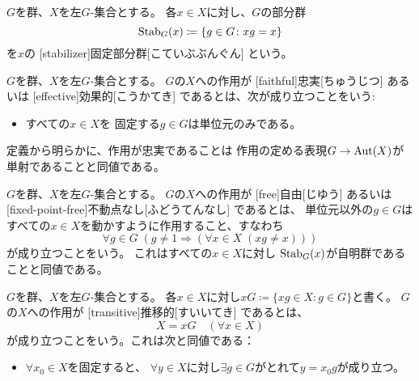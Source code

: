 \documentclass[report]{jlreq}
\begin{document}
\begin{definition}[固定部分群]
    $G$を群、$X$を左$G$-集合とする。
    各$x \in X$に対し、$G$の部分群
    \begin{equation}
        \operatorname{Stab}_G(x) \coloneqq \{ g \in G \colon xg = x \}
    \end{equation}
    を$x$の
    [stabilizer]{固定部分群}[こていぶぶんぐん]
    という。
\end{definition}

\begin{definition}[忠実作用]
    $G$を群、$X$を左$G$-集合とする。
    $G$の$X$への作用が
    [faithful]{忠実}[ちゅうじつ]
    あるいは
    [effective]{効果的}[こうかてき]
    であるとは、次が成り立つことをいう:
    \begin{itemize}
        \item すべての$x \in X$を
            固定する$g \in G$は単位元のみである。
    \end{itemize}
    定義から明らかに、作用が忠実であることは
    作用の定める表現$G \to \operatorname{Aut}(X)$が単射であることと同値である。
\end{definition}

\begin{definition}[自由作用]
    $G$を群、$X$を左$G$-集合とする。
    $G$の$X$への作用が
    [free]{自由}[じゆう]
    あるいは
    [fixed-point-free]{不動点なし}[ふどうてんなし]
    であるとは、
    単位元以外の$g \in G$はすべての$x \in X$を動かすように作用すること、すなわち
    \begin{equation}
        \forall g \in G \; (g \neq 1 \Rightarrow (\forall x \in X \; (xg \neq x)))
    \end{equation}
    が成り立つことをいう。
    これはすべての$x \in X$に対し
    $\operatorname{Stab}_G(x)$が自明群であることと同値である。
\end{definition}

\begin{definition}[推移的作用]
    $G$を群、$X$を左$G$-集合とする。
    各$x \in X$に対し$xG \coloneqq \{ xg \in X \colon g \in G \}$と書く。
    $G$の$X$への作用が
    [transitive]{推移的}[すいいてき]
    であるとは、
    \begin{equation}
        X = xG \quad (\forall x \in X)
    \end{equation}
    が成り立つことをいう。これは次と同値である：
    \begin{itemize}
        \item $\forall x_0 \in X$を固定すると、
            $\forall y \in X$に対し$\exists g \in G$がとれて$y = x_0 g$が成り立つ。
    \end{itemize}
\end{definition}
\end{document}
